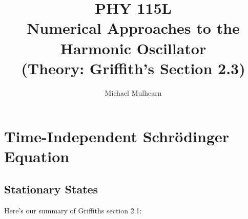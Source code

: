 \documentclass[12pt]{book}
\begin{document}
\newcommand{\ihbar}{\ensuremath{i \hbar}}
\newcommand{\Pss}{\ensuremath{\Psi^*}}
\newcommand{\dPsidt}{\ensuremath{ \frac{\partial \Psi}{\partial t} }}
\newcommand{\dPsidx}{\ensuremath{ \frac{\partial \Psi}{\partial x} }}
\newcommand{\ddPsidx}{\ensuremath{ \frac{\partial^2 \Psi}{\partial x^2} }}
\newcommand{\dPssdt}{\ensuremath{ \frac{\partial \Psi^*}{\partial t} }}
\newcommand{\dPssdx}{\ensuremath{ \frac{\partial \Psi^*}{\partial x} }}
\newcommand{\ddPssdx}{\ensuremath{ \frac{\partial^2 \Psi^*}{\partial x^2} }}

\newcommand{\dphidt}{\ensuremath{ \frac{d \phi}{dt} }}
\newcommand{\dpsidx}{\ensuremath{ \frac{d \psi}{dx} }}
\newcommand{\ddpsidx}{\ensuremath{ \frac{d^2 \psi}{dx^2} }}


\title{PHY 115L \\
Numerical Approaches to the \\
Harmonic Oscillator \\ 
(Theory:  Griffith's Section 2.3)}
\author{Michael Mulhearn}

\maketitle

\setcounter{chapter}{1}
\chapter{Time-Independent Schr\"odinger Equation}

\section{Stationary States}

Here's our summary of Griffiths section 2.1:
\end{document}
